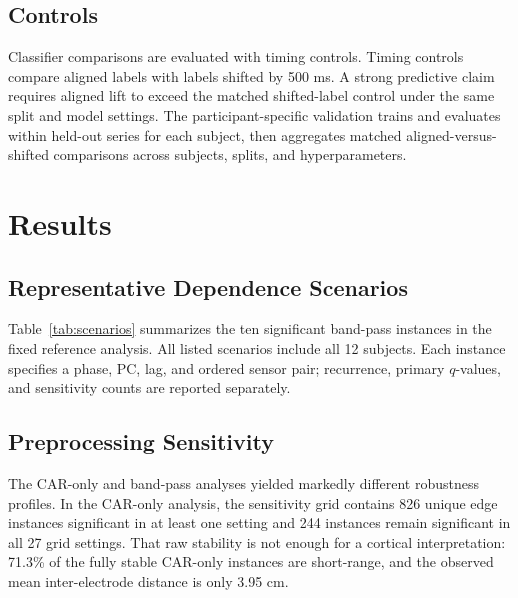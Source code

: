 \documentclass[10pt,journal]{IEEEtran}
\begin{document}
\subsection{Controls}
Classifier comparisons are evaluated with timing controls. Timing controls compare aligned labels with labels shifted by 500 ms. A strong predictive claim requires aligned lift to exceed the matched shifted-label control under the same split and model settings. The participant-specific validation trains and evaluates within held-out series for each subject, then aggregates matched aligned-versus-shifted comparisons across subjects, splits, and hyperparameters.

\section{Results}
\subsection{Representative Dependence Scenarios}
Table~\ref{tab:scenarios} summarizes the ten significant band-pass instances in the fixed reference analysis. All listed scenarios include all 12 subjects. Each instance specifies a phase, PC, lag, and ordered sensor pair; recurrence, primary $q$-values, and sensitivity counts are reported separately.

\begin{table}[!t]
    \centering
    \caption{Significant band-pass instances in the fixed reference analysis. $K/N$ is recurrence across participants; $q$ is from the reference setting. Settings counts significance and reportability across the 27-setting sensitivity grid.}
    \label{tab:scenarios}
    \footnotesize
    \setlength{\tabcolsep}{4pt}
\end{table}

\subsection{Preprocessing Sensitivity}
The CAR-only and band-pass analyses yielded markedly different robustness profiles. In the CAR-only analysis, the sensitivity grid contains 826 unique edge instances significant in at least one setting and 244 instances remain significant in all 27 grid settings. That raw stability is not enough for a cortical interpretation: 71.3\% of the fully stable CAR-only instances are short-range, and the observed mean inter-electrode distance is only 3.95 cm.
\end{document}
